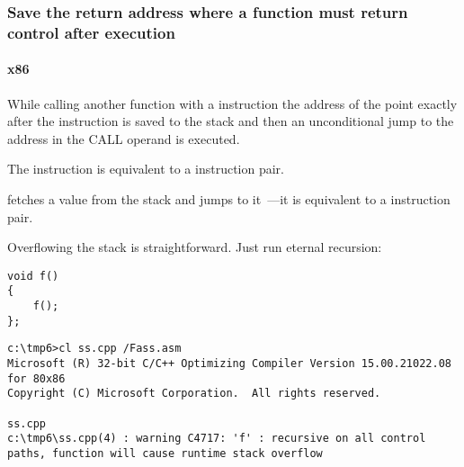 ﻿\subsubsection{
{Save the return address where a function must return control after execution}}

\paragraph{x86}

{While calling another function with a \CALL instruction the address of the point exactly after the \CALL instruction is saved 
to the stack and then an unconditional jump to the address in the CALL operand is executed.} 

{The \CALL instruction is equivalent to a  instruction pair}.

{\RET fetches a value from the stack and jumps to it~---it is equivalent to a  instruction pair.}

\index{\Recursion}
{Overflowing the stack is straightforward. Just run eternal recursion:}

\begin{lstlisting}
void f()
{
	f();
};
\end{lstlisting}


\begin{lstlisting}
c:\tmp6>cl ss.cpp /Fass.asm
Microsoft (R) 32-bit C/C++ Optimizing Compiler Version 15.00.21022.08 for 80x86
Copyright (C) Microsoft Corporation.  All rights reserved.

ss.cpp
c:\tmp6\ss.cpp(4) : warning C4717: 'f' : recursive on all control paths, function will cause runtime stack overflow
\end{lstlisting}

